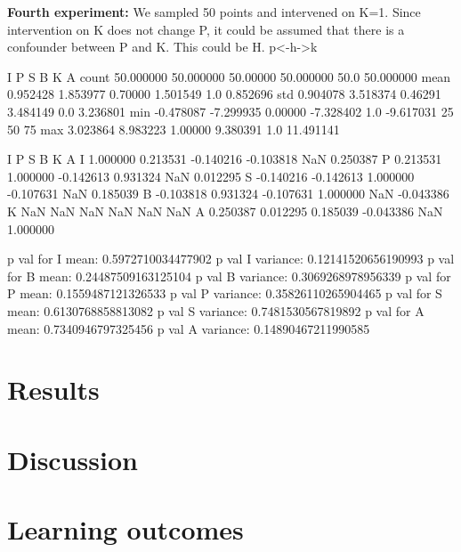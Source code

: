 \documentclass[12pt,fleqn,]{article}
\begin{document}
\begin{multicols}{2}
\textbf{Fourth experiment:} We sampled 50 points and intervened on K=1. Since intervention on K does not change P, it could be assumed that there is a confounder between P and K. This could be H.
p<-h->k


           I          P         S          B     K          A
count  50.000000  50.000000  50.00000  50.000000  50.0  50.000000
mean    0.952428   1.853977   0.70000   1.501549   1.0   0.852696
std     0.904078   3.518374   0.46291   3.484149   0.0   3.236801
min    -0.478087  -7.299935   0.00000  -7.328402   1.0  -9.617031
25%
50%
75%
max     3.023864   8.983223   1.00000   9.380391   1.0  11.491141

      I         P         S         B   K         A
I  1.000000  0.213531 -0.140216 -0.103818 NaN  0.250387
P  0.213531  1.000000 -0.142613  0.931324 NaN  0.012295
S -0.140216 -0.142613  1.000000 -0.107631 NaN  0.185039
B -0.103818  0.931324 -0.107631  1.000000 NaN -0.043386
K       NaN       NaN       NaN       NaN NaN       NaN
A  0.250387  0.012295  0.185039 -0.043386 NaN  1.000000

p val for I mean: 0.5972710034477902
p val I variance: 0.12141520656190993
p val for B mean: 0.24487509163125104
p val B variance: 0.3069268978956339
p val for P mean: 0.1559487121326533
p val P variance: 0.35826110265904465
p val for S mean: 0.6130768858813082
p val S variance: 0.7481530567819892
p val for A mean: 0.7340946797325456
p val A variance: 0.14890467211990585


\end{multicols}		

\section{Results}



\begin{multicols}{2}
	
	\section{Discussion}
	

	
	\section{Learning outcomes} 
	
\end{multicols}

\newpage
\begin{thebibliography}{9}
	

	
	
	

\end{thebibliography}
\end{document}
